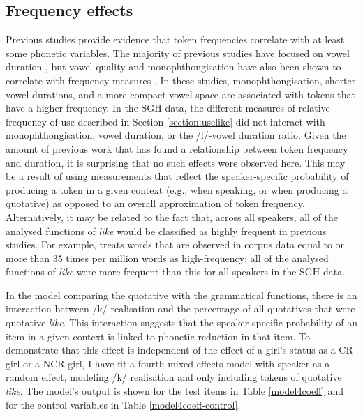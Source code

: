 \subsection{Frequency effects}

Previous studies provide evidence that token frequencies correlate with at least some phonetic variables.  The majority of previous studies have focused on vowel duration \cite{bybee2001,jurafskyetal2002,gahl-thyme}, but vowel quality and monophthongisation have also been shown to correlate with frequency measures \cite{munson2007,oprah1999}.  In these studies, monophthongisation, shorter vowel durations, and a more compact vowel space are associated with tokens that have a higher frequency.  In the SGH data, the different measures of relative frequency of use described in Section \ref{section:uselike} did not interact with monophthongisation, vowel duration, or the /l/-vowel duration ratio.  Given the amount of previous work that has found a relationship between token frequency and duration, it is surprising that no such effects were observed here.  This may be a result of using measurements that reflect the speaker-specific probability of producing a token in a given context (e.g., when speaking, or when producing a quotative) as opposed to an overall approximation of token frequency.  Alternatively, it may be related to the fact that, across all speakers, all of the analysed functions of \textit{like} would be classified as highly frequent in previous studies.  For example,  treats words that are observed in corpus data equal to or more than 35 times per million words as high-frequency; all of the analysed functions of \textit{like} were more frequent than this for all speakers in the SGH data.  

In the model comparing the quotative with the grammatical functions, there is an interaction between /k/ realisation and the percentage of all quotatives that were quotative \textit{like}.  This interaction suggests that the speaker-specific probability of an item in a given context is linked to phonetic reduction in that item.  To demonstrate that this effect is independent of the effect of a girl's status as a CR girl or a NCR girl, I have fit a fourth mixed effects model with speaker as a random effect, modeling /k/ realisation and only including tokens of quotative \textit{like}. The model's output is shown for the test items in Table \ref{model4coeff} and for the control variables in Table \ref{model4coeff-control}.

